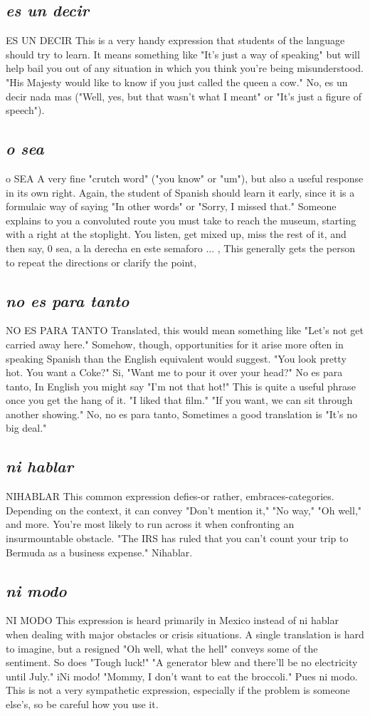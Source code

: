 \subsection{\emph{es un decir}}
ES UN DECIR
This is a very handy expression that students of the language
should try to learn. It means something like "It's just a way of speaking" but will help bail you out of any situation in which you think
you're being misunderstood. "His Majesty would like to know if you
just called the queen a cow." No, es un decir nada mas ("Well, yes, but
that wasn't what I meant" or "It's just a figure of speech").
\subsection{\emph{o sea}}
o SEA
A very fine "crutch word" ("you know" or "um"), but also a
useful response in its own right. Again, the student of Spanish should
learn it early, since it is a formulaic way of saying "In other words" or
"Sorry, I missed that." Someone explains to you a convoluted route
you must take to reach the museum, starting with a right at the stoplight. You listen, get mixed up, miss the rest of it, and then say, 0 sea,
a la derecha en este semaforo ... , This generally gets the person to
repeat the directions or clarify the point,
\subsection{\emph{no es para tanto}}
NO ES PARA TANTO
Translated, this would mean something like "Let's not get carried away here." Somehow, though, opportunities for it arise more often in speaking Spanish than the English equivalent would suggest.
"You look pretty hot. You want a Coke?" Si, "Want me to pour it over
your head?" No es para tanto, In English you might say "I'm not that
hot!" This is quite a useful phrase once you get the hang of it. "I liked
that film." "If you want, we can sit through another showing." No, no
es para tanto, Sometimes a good translation is "It's no big deal."
\subsection{\emph{ni hablar}}
NIHABLAR
This common expression defies-or rather, embraces-categories. Depending on the context, it can convey "Don't mention it,"
"No way," "Oh well," and more. You're most likely to run across it
when confronting an insurmountable obstacle. "The IRS has ruled
that you can't count your trip to Bermuda as a business expense."
Nihablar.
\subsection{\emph{ni modo}}
NI MODO
This expression is heard primarily in Mexico instead of ni
hablar when dealing with major obstacles or crisis situations. A single
translation is hard to imagine, but a resigned "Oh well, what the hell"
conveys some of the sentiment. So does "Tough luck!" "A generator
blew and there'll be no electricity until July." iNi modo! "Mommy, I
don't want to eat the broccoli." Pues ni modo. This is not a very sympathetic expression, especially if the problem is someone else's, so be
careful how you use it.

